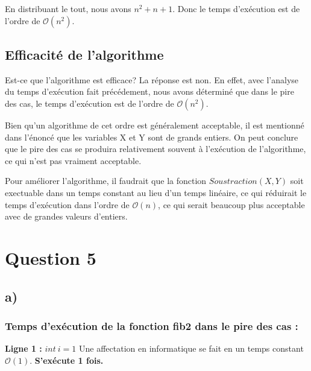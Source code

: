 \documentclass[12pt]{article}
\begin{document}
    \noindent En distribuant le tout, nous avons \( n ^ 2 + n + 1 \). Donc le
    temps d'exécution est de l'ordre de \( \mathcal{O}(n^2) \).

  \subsection*{Efficacité de l'algorithme}
   	Est-ce que l'algorithme est efficace? La réponse est non. En effet, avec
   	l'analyse du temps d'exécution fait précédement, nous avons déterminé
   	que dans le pire des cas, le temps d'exécution est de l'ordre
   	de \( \mathcal{O}(n^2) \). \newline

   	\noindent Bien qu'un algorithme de cet ordre est généralement acceptable,
   	il est mentionné dans l'énoncé que les variables X et Y sont de grands
   	entiers. On peut conclure que le pire des cas se produira relativement
   	souvent à l'exécution de l'algorithme, ce qui n'est pas vraiment
    acceptable. \newline

    \noindent Pour améliorer l'algorithme, il faudrait que la fonction
    \( Soustraction(X, Y) \) soit exectuable dans un temps constant au lieu d'un
    temps linéaire, ce qui réduirait le temps d'exécution dans l'ordre de
    \( \mathcal{O}(n) \), ce qui serait beaucoup plus acceptable avec de grandes
    valeurs d'entiers.

  \newpage

  \section*{Question 5}
  	\subsection*{a)}
  
  	  \subsubsection*{Temps d'exécution de la fonction fib2 dans le pire des cas :}
  	
  	    \noindent \textbf{Ligne 1 :} \( int \: i = 1 \) \newline
        Une affectation en informatique se fait en un temps constant
        \( \mathcal{O}(1) \). \newline
		\textbf{S'exécute 1 fois.} \newline
\end{document}

